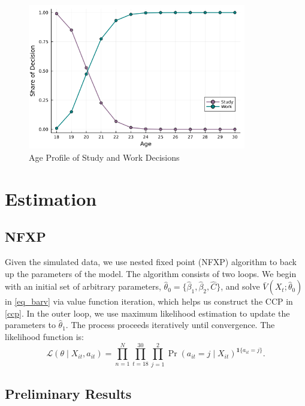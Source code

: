 \documentclass[a4paper, 12pt]{article}
\begin{document}
\begin{figure}[] 
    \centering
    \includegraphics[width=0.85\textwidth]{decision_by_age.png}
    \caption{Age Profile of Study and Work Decisions}
    \label{fig:decision_by_age}
\end{figure}




\section{Estimation}
\subsection{NFXP}
Given the simulated data, we use nested fixed point (NFXP) algorithm to back up the parameters of the model. 
The algorithm consists of two loops. 
We begin with an initial set of arbitrary parameters, $\hat\theta_0=\{\hat\beta_1, \hat\beta_2, \hat{C}\}$, 
and solve $\bar V(X_t; \hat\theta_0)$ in \eqref{eq_barv} via value function iteration, which helps us construct the CCP in \eqref{ccp}. 
In the outer loop, we use maximum likelihood estimation to update the parameters to $\hat\theta_1$. The process proceeds iteratively until convergence.
The likelihood function is:
\begin{equation}
    \mathcal{L}(\theta\mid X_{it}, a_{it}) 
    = \prod_{n=1}^N\prod_{t=18}^{30}\prod_{j=1}^2\Pr(a_{it}=j\mid X_{it})^{\mathbf{1}\{a_{it}=j\}}.
    \label{likelihood_func}
    \end{equation}



\subsection{Preliminary Results}
\end{document}
